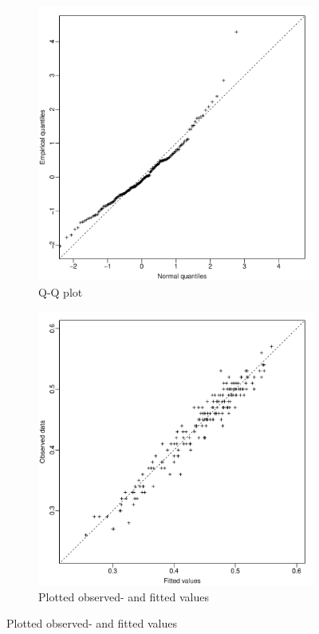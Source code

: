 \documentclass[12pt,a4paper,twoside]{article}
\begin{document}
\begin{figure}[!ht]
    \begin{subfigure}{0.5\textwidth}
        \centering
        \includegraphics[width=\textwidth]{img/KARMA-Q-Q.pdf}
        \caption{Q-Q plot}
        \label{fig:KARMAQQ}
    \end{subfigure}
    \begin{subfigure}{0.5\textwidth}
        \centering
        \includegraphics[width=\textwidth]{img/KARMA-obs-fitted.pdf}
        \caption{Plotted observed- and fitted values}
        \label{fig:KARMAobsfitted}
    \end{subfigure}
\end{figure}
\end{document}
